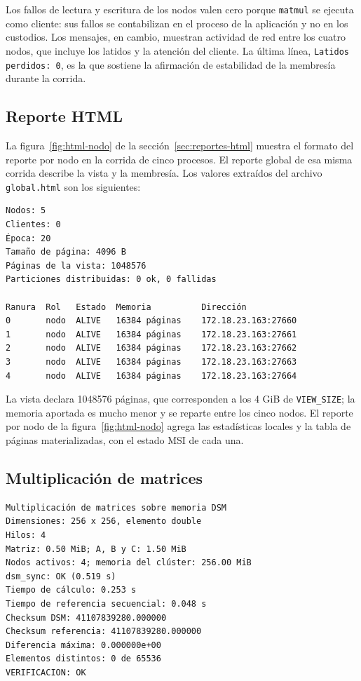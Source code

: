Los fallos de lectura y escritura de los nodos valen cero porque \texttt{matmul} se ejecuta como cliente: sus fallos se contabilizan en el proceso de la aplicación y no en los custodios. Los mensajes, en cambio, muestran actividad de red entre los cuatro nodos, que incluye los latidos y la atención del cliente. La última línea, \texttt{Latidos perdidos: 0}, es la que sostiene la afirmación de estabilidad de la membresía durante la corrida.

\subsection{Reporte HTML}

La figura~\ref{fig:html-nodo} de la sección~\ref{sec:reportes-html} muestra el formato del reporte por nodo en la corrida de cinco procesos. El reporte global de esa misma corrida describe la vista y la membresía. Los valores extraídos del archivo \texttt{global.html} son los siguientes:

\begin{lstlisting}[caption={Valores del reporte global \texttt{global.html} de la corrida local.}, label={lst:salida-html}]
Nodos: 5
Clientes: 0
Época: 20
Tamaño de página: 4096 B
Páginas de la vista: 1048576
Particiones distribuidas: 0 ok, 0 fallidas

Ranura  Rol   Estado  Memoria          Dirección
0       nodo  ALIVE   16384 páginas    172.18.23.163:27660
1       nodo  ALIVE   16384 páginas    172.18.23.163:27661
2       nodo  ALIVE   16384 páginas    172.18.23.163:27662
3       nodo  ALIVE   16384 páginas    172.18.23.163:27663
4       nodo  ALIVE   16384 páginas    172.18.23.163:27664
\end{lstlisting}

La vista declara 1048576 páginas, que corresponden a los 4 GiB de \texttt{VIEW\_SIZE}; la memoria aportada es mucho menor y se reparte entre los cinco nodos. El reporte por nodo de la figura~\ref{fig:html-nodo} agrega las estadísticas locales y la tabla de páginas materializadas, con el estado MSI de cada una.

\subsection{Multiplicación de matrices}

\begin{lstlisting}[caption={Salida de \texttt{matmul 256 --hilos 4} en el clúster local de cuatro nodos.}, label={lst:salida-matmul}]
Multiplicación de matrices sobre memoria DSM
Dimensiones: 256 x 256, elemento double
Hilos: 4
Matriz: 0.50 MiB; A, B y C: 1.50 MiB
Nodos activos: 4; memoria del clúster: 256.00 MiB
dsm_sync: OK (0.519 s)
Tiempo de cálculo: 0.253 s
Tiempo de referencia secuencial: 0.048 s
Checksum DSM: 41107839280.000000
Checksum referencia: 41107839280.000000
Diferencia máxima: 0.000000e+00
Elementos distintos: 0 de 65536
VERIFICACION: OK
\end{lstlisting}

